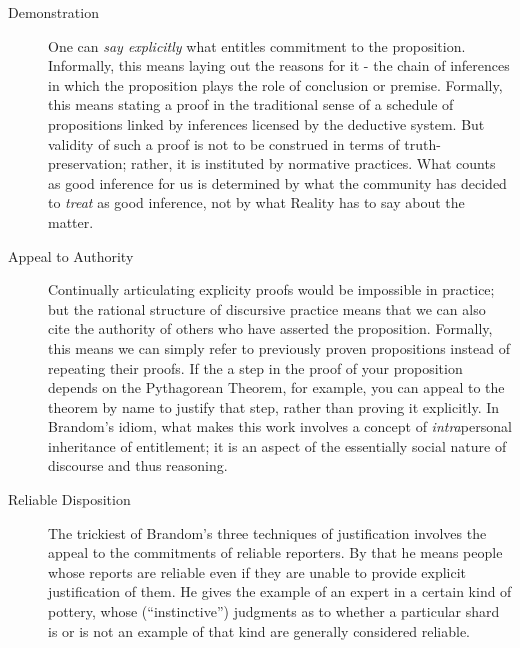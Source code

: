 \begin{description}
\item [Demonstration] One can \emph{say explicitly} what entitles
  commitment to the proposition.  Informally, this means laying out
  the reasons for it - the chain of inferences in which the
  proposition plays the role of conclusion or premise.  Formally,
  this means stating a proof in the traditional sense of a schedule of
  propositions linked by inferences licensed by the deductive system.
  But validity of such a proof is not to be construed in terms of
  truth-preservation; rather, it is instituted by normative
  practices.  What counts as good inference for us
  is determined by what the community has decided to \emph{treat} as
  good inference, not by what Reality has to say about the matter.

\item [Appeal to Authority] Continually articulating explicity proofs
  would be impossible in practice; but the rational structure of
  discursive practice means that we can also cite the authority of
  others who have asserted the proposition.  Formally, this means we
  can simply refer to previously proven propositions instead of
  repeating their proofs.  If the a step in the proof of your
  proposition depends on the Pythagorean Theorem, for example, you can
  appeal to the theorem by name to justify that step, rather than
  proving it explicitly.  In Brandom's idiom, what makes this work
  involves a concept of \emph{intra}personal inheritance of
  entitlement; it is an aspect of the essentially social nature of
  discourse and thus reasoning.

\item [Reliable Disposition] The trickiest of Brandom's three
  techniques of justification involves the appeal to the commitments
  of reliable reporters.  By that he means people whose reports are
  reliable even if they are unable to provide explicit justification
  of them.  He gives the example of an expert in a certain kind of
  pottery, whose (``instinctive'') judgments as to whether a
  particular shard is or is not an example of that kind are generally
  considered reliable.
\end{description}

